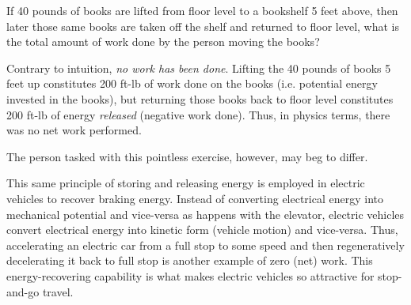 

If 40 pounds of books are lifted from floor level to a bookshelf 5 feet above, then later those same books are taken off the shelf and returned to floor level, what is the total amount of work done by the person moving the books?







Contrary to intuition, {\it no work has been done}.  Lifting the 40 pounds of books 5 feet up constitutes 200 ft-lb of work done on the books (i.e. potential energy invested in the books), but returning those books back to floor level constitutes 200 ft-lb of energy {\it released} (negative work done).  Thus, in physics terms, there was no net work performed.

\vskip 10pt

The person tasked with this pointless exercise, however, may beg to differ.

\vskip 10pt

This same principle of storing and releasing energy is employed in electric vehicles to recover braking energy.  Instead of converting electrical energy into mechanical potential and vice-versa as happens with the elevator, electric vehicles convert electrical energy into kinetic form (vehicle motion) and vice-versa.  Thus, accelerating an electric car from a full stop to some speed and then regeneratively decelerating it back to full stop is another example of zero (net) work.  This energy-recovering capability is what makes electric vehicles so attractive for stop-and-go travel.











